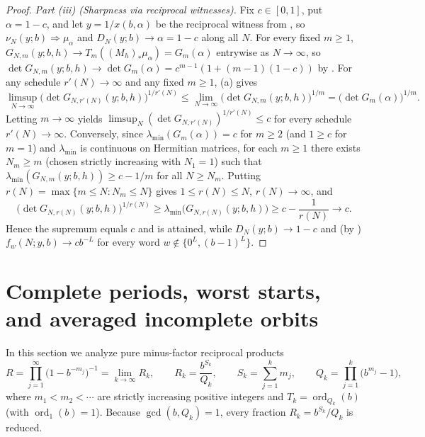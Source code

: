 \documentclass[11pt]{article}
\DeclareMathOperator{\ord}{ord}
\begin{document}
\begin{proof}
\emph{Part \textup{(iii)} (Sharpness via reciprocal witnesses).} Fix $c\in[0,1]$, put $\alpha=1-c$, and let $y=1/x(b,\alpha)$ be the reciprocal witness from , so $\nu_N(y;b)\Rightarrow\mu_\alpha$ and $D_N(y;b)\to\alpha=1-c$ along all $N$. For every fixed $m\ge1$, $G_{N,m}(y;b,h)\to T_m((M_h)_*\mu_\alpha)=G_m(\alpha)$ entrywise as $N\to\infty$, so $\det G_{N,m}(y;b,h)\to\det G_m(\alpha)=c^{m-1}(1+(m-1)(1-c))$ by . For any schedule $r'(N)\to\infty$ and any fixed $m\ge1$, (a) gives
\[
\limsup_{N\to\infty}\bigl(\det G_{N,r'(N)}(y;b,h)\bigr)^{1/r'(N)}\le\lim_{N\to\infty}\bigl(\det G_{N,m}(y;b,h)\bigr)^{1/m}=\bigl(\det G_m(\alpha)\bigr)^{1/m}.
\]
Letting $m\to\infty$ yields $\limsup_N(\det G_{N,r'(N)})^{1/r'(N)}\le c$ for every schedule $r'(N)\to\infty$. Conversely, since $\lambda_{\min}(G_m(\alpha))=c$ for $m\ge2$ (and $1\ge c$ for $m=1$) and $\lambda_{\min}$ is continuous on Hermitian matrices, for each $m\ge1$ there exists $N_m\ge m$ (chosen strictly increasing with $N_1=1$) such that $\lambda_{\min}(G_{N,m}(y;b,h))\ge c-1/m$ for all $N\ge N_m$. Putting $r(N)=\max\{m\le N:N_m\le N\}$ gives $1\le r(N)\le N$, $r(N)\to\infty$, and
\[
\bigl(\det G_{N,r(N)}(y;b,h)\bigr)^{1/r(N)}\ge\lambda_{\min}\bigl(G_{N,r(N)}(y;b,h)\bigr)\ge c-\frac{1}{r(N)}\longrightarrow c.
\]
Hence the supremum equals $c$ and is attained, while $D_N(y;b)\to 1-c$ and (by ) $f_w(N;y,b)\to cb^{-L}$ for every word $w\notin\{0^L,(b-1)^L\}$.
\end{proof}

\section{Complete periods, worst starts, and averaged incomplete orbits}\label{sec:incomplete}

In this section we analyze pure minus-factor reciprocal products
\[
R=\prod_{j=1}^\infty\bigl(1-b^{-m_j}\bigr)^{-1}=\lim_{k\to\infty}R_k,\qquad
R_k=\frac{b^{S_k}}{Q_k},\qquad
S_k=\sum_{j=1}^k m_j,\qquad
Q_k=\prod_{j=1}^k\bigl(b^{m_j}-1\bigr),
\]
where $m_1<m_2<\cdots$ are strictly increasing positive integers and $T_k=\ord_{Q_k}(b)$ (with $\ord_1(b)=1$). Because $\gcd(b,Q_k)=1$, every fraction $R_k=b^{S_k}/Q_k$ is reduced.
\end{document}

